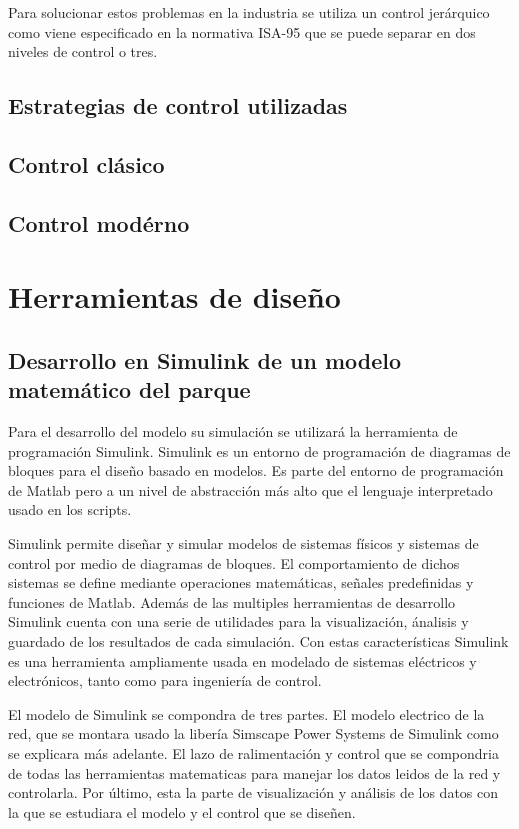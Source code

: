 \documentclass{book}
\begin{document}
 Para solucionar estos problemas en la industria se utiliza un control jer\'arquico como viene especificado en la normativa ISA-95 que se puede separar en dos niveles de control \cite{PowerLoadControl} o tres. 

	\section{Estrategias de control utilizadas}

	\section{Control cl\'asico}

	\section{Control mod\'erno}

\chapter{Herramientas de diseño}


	\section{Desarrollo en Simulink de un modelo matem\'atico del parque}

Para el desarrollo del modelo su simulaci\'on se utilizar\'a la herramienta de programaci\'on Simulink. Simulink es un entorno de programaci\'on de diagramas de bloques para el diseño basado en modelos. Es parte del entorno de programaci\'on de Matlab pero a un nivel de abstracci\'on m\'as alto que el lenguaje interpretado usado en los scripts. \par

Simulink permite diseñar y simular modelos de sistemas f\'isicos y sistemas de control por medio de diagramas de bloques. El comportamiento de dichos sistemas se define mediante operaciones matem\'aticas, señales predefinidas y funciones de Matlab. Adem\'as de las multiples herramientas de desarrollo Simulink cuenta con una serie de utilidades para la visualizaci\'on, \'analisis y guardado de los resultados de cada simulaci\'on. Con estas caracter\'isticas Simulink es una herramienta ampliamente usada en modelado de sistemas el\'ectricos y electr\'onicos, tanto como para ingenier\'ia de control. \par

El modelo de Simulink se compondra de tres partes. El modelo electrico de la red, que se montara usado la liber\'ia Simscape Power Systems de Simulink como se explicara m\'as adelante. El lazo de ralimentaci\'on y control que se compondria de todas las herramientas matematicas para manejar los datos leidos de la red y controlarla. Por \'ultimo, esta la parte de visualizaci\'on y an\'alisis de los datos con la que se estudiara el modelo y el control que se diseñen.   \par
\end{document}
